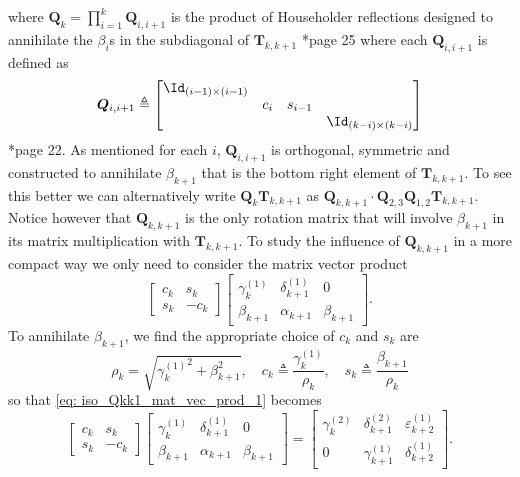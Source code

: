 where $\bm{Q}_k = \prod_{i=1}^{k} \bm{Q}_{i,i+1}$ is the product of Householder reflections designed to annihilate the $\beta_i$s in the subdiagonal of $\bm{T}_{k,k+1}$ \cite{ChoiSou-ChengTerrya2007Imfs}*{page 25} where each $\bm{Q}_{i,i+1}$ is defined as
\begin{equation*}
    \bm{Q}_{i,i+1} \triangleq
    \begin{bmatrix}
        \Id_{(i-1) \times (i-1)} &       &         &                          \\
                                 & c_{i} & s_{i-1} &                          \\
                                 &       &         & \Id_{(k-i) \times (k-i)}
    \end{bmatrix}
\end{equation*}
\cite{ChoiSou-ChengTerrya2007Imfs}*{page 22}. As mentioned for each $i$, $\bm{Q}_{i,i+1}$ is orthogonal, symmetric and constructed to annihilate $\beta_{k+1}$ that is the bottom right element of $\bm{T}_{k,k+1}$. To see this better we can alternatively write $\bm{Q}_k \bm{T}_{k,k+1}$ as $\bm{Q}_{k,k+1} \cdot \bm{Q}_{2,3}\bm{Q}_{1,2} \bm{T}_{k,k+1}$. Notice however that $\bm{Q}_{k,k+1}$ is the only rotation matrix that will involve $\beta_{k+1}$ in its matrix multiplication with $\bm{T}_{k,k+1}$. To study the influence of $\bm{Q}_{k,k+1}$ in a more compact way we only need to consider the matrix vector product
\begin{equation} \label{eq: iso_Qkk1_mat_vec_prod_1}
    \begin{bmatrix}
        c_k & s_k  \\
        s_k & -c_k
    \end{bmatrix}
    \begin{bmatrix}
        \gamma_{k}^{(1)} & \delta_{k+1}^{(1)} & 0           \\
        \beta_{k+1}      & \alpha_{k+1}       & \beta_{k+1}
    \end{bmatrix}.
\end{equation}
To annihilate $\beta_{k+1}$, we find the appropriate choice of $c_k$ and $s_k$ are
\begin{equation*}
    \rho_k = \sqrt{{\gamma_k^{(1)}}^{2} + \beta_{k+1}^{2}}, \quad c_k \triangleq \frac{\gamma_{k}^{(1)}}{\rho_k}, \quad s_k \triangleq \frac{\beta_{k+1}}{\rho_{k}}
\end{equation*}
so that \ref{eq: iso_Qkk1_mat_vec_prod_1} becomes
\begin{equation*}
    \begin{bmatrix}
        c_k & s_k  \\
        s_k & -c_k
    \end{bmatrix}
    \begin{bmatrix}
        \gamma_{k}^{(1)} & \delta_{k+1}^{(1)} & 0           \\
        \beta_{k+1}      & \alpha_{k+1}       & \beta_{k+1}
    \end{bmatrix}
    =
    \begin{bmatrix}
        \gamma_{k}^{(2)} & \delta_{k+1}^{(2)} & \varepsilon_{k+2}^{(1)} \\
        0                & \gamma_{k+1}^{(1)} & \delta_{k+2}^{(1)}
    \end{bmatrix}.
\end{equation*}
